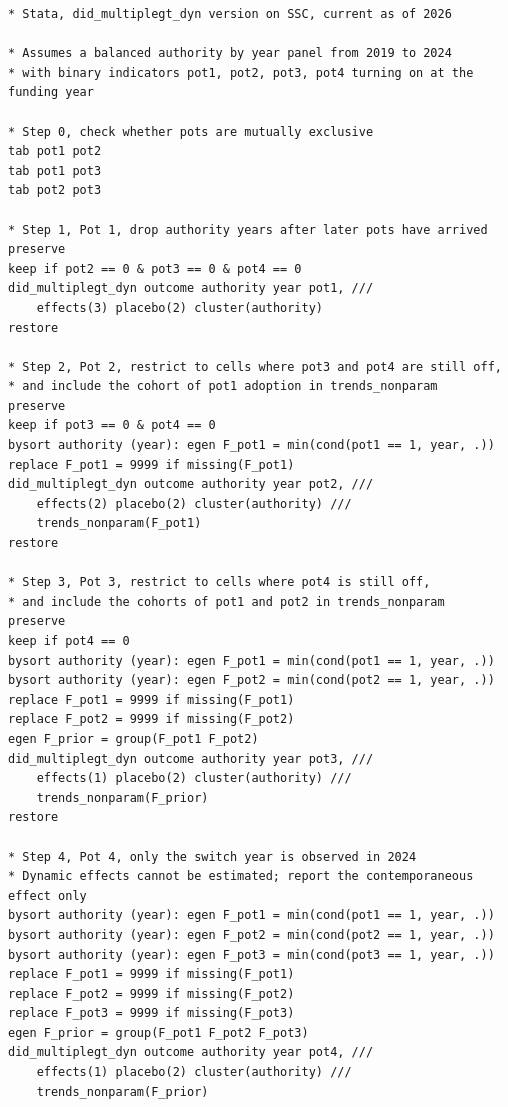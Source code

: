 \begin{lstlisting}
* Stata, did_multiplegt_dyn version on SSC, current as of 2026

* Assumes a balanced authority by year panel from 2019 to 2024
* with binary indicators pot1, pot2, pot3, pot4 turning on at the funding year

* Step 0, check whether pots are mutually exclusive
tab pot1 pot2
tab pot1 pot3
tab pot2 pot3

* Step 1, Pot 1, drop authority years after later pots have arrived
preserve
keep if pot2 == 0 & pot3 == 0 & pot4 == 0
did_multiplegt_dyn outcome authority year pot1, ///
    effects(3) placebo(2) cluster(authority)
restore

* Step 2, Pot 2, restrict to cells where pot3 and pot4 are still off,
* and include the cohort of pot1 adoption in trends_nonparam
preserve
keep if pot3 == 0 & pot4 == 0
bysort authority (year): egen F_pot1 = min(cond(pot1 == 1, year, .))
replace F_pot1 = 9999 if missing(F_pot1)
did_multiplegt_dyn outcome authority year pot2, ///
    effects(2) placebo(2) cluster(authority) ///
    trends_nonparam(F_pot1)
restore

* Step 3, Pot 3, restrict to cells where pot4 is still off,
* and include the cohorts of pot1 and pot2 in trends_nonparam
preserve
keep if pot4 == 0
bysort authority (year): egen F_pot1 = min(cond(pot1 == 1, year, .))
bysort authority (year): egen F_pot2 = min(cond(pot2 == 1, year, .))
replace F_pot1 = 9999 if missing(F_pot1)
replace F_pot2 = 9999 if missing(F_pot2)
egen F_prior = group(F_pot1 F_pot2)
did_multiplegt_dyn outcome authority year pot3, ///
    effects(1) placebo(2) cluster(authority) ///
    trends_nonparam(F_prior)
restore

* Step 4, Pot 4, only the switch year is observed in 2024
* Dynamic effects cannot be estimated; report the contemporaneous effect only
bysort authority (year): egen F_pot1 = min(cond(pot1 == 1, year, .))
bysort authority (year): egen F_pot2 = min(cond(pot2 == 1, year, .))
bysort authority (year): egen F_pot3 = min(cond(pot3 == 1, year, .))
replace F_pot1 = 9999 if missing(F_pot1)
replace F_pot2 = 9999 if missing(F_pot2)
replace F_pot3 = 9999 if missing(F_pot3)
egen F_prior = group(F_pot1 F_pot2 F_pot3)
did_multiplegt_dyn outcome authority year pot4, ///
    effects(1) placebo(2) cluster(authority) ///
    trends_nonparam(F_prior)
\end{lstlisting}

